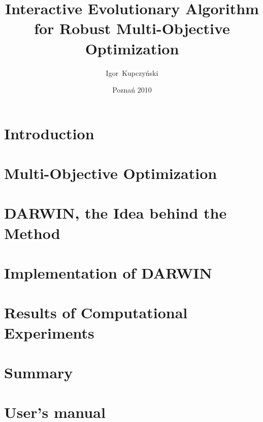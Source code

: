 \documentclass[a4paper,english,thesis]{dcsbook}
\author{Igor~Kupczy\'nski}
\date{Pozna\'n 2010}
\title{Interactive Evolutionary Algorithm \\ for Robust Multi-Objective
  Optimization}
\begin{document}
\maketitle
\frontmatter
\tableofcontents{}
\mainmatter

\chapter{Introduction}

\chapter{Multi-Objective Optimization}


\chapter{DARWIN, the Idea behind the Method}
\label{darwin-the-idea}

\chapter{Implementation of DARWIN}
\label{darwin-implementation}


\chapter{Results of Computational Experiments}
\label{exp-results}


\chapter{Summary}


\backmatter



\appendix
\appendixpage
\addappheadtotoc
\chapter{User's manual}

\end{document}
